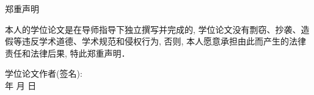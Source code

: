 {\pagestyle{empty}
\newpage
\vspace*{20pt}
\begin{center}{\heiti 郑重声明}\end{center}
\par\vspace*{30pt}
\renewcommand{\baselinestretch}{2}
{ \songti %

本人的学位论文是在导师指导下独立撰写并完成的,
学位论文没有剽窃、抄袭、造假等违反学术道德、学术规范和侵权行为,
否则, 本人愿意承担由此而产生的法律责任和法律后果,
特此郑重声明．

\vskip2cm

\hspace*{4cm}学位论文作者(签名): \hspace{4cm} \hfill \\[1cm]
\hspace*{10cm}年 \hfill  月 \hfill 日\hspace{1cm}\hfill\par}

  \iflib
  \else
  \newpage
  \cleardoublepage
  \fi
}
\renewcommand{\baselinestretch}{1.6}
\small\normalsize 




